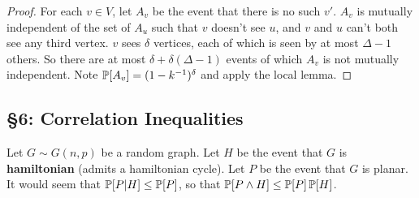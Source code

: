 \documentclass[11pt]{article}
\begin{document}
\begin{chapter5}
\begin{proof}
\INDENT For each $v\in V$, let $A_v$ be the event that there is no such $v'$. $A_v$ is mutually independent of the set of $A_u$ such that $v$ doesn't see $u$, and $v$ and $u$ can't both see any third vertex. $v$ sees $\delta$ vertices, each of which is seen by at most $\Delta-1$ others. So there are at most $\delta+\delta(\Delta-1)$ events of which $A_v$ is not mutually independent. Note $\operatorname{\mathbb{P}}[A_v]=(1-k^{-1})^\delta$ and apply the local lemma.
\end{proof}
\end{chapter5}
\begin{chapter6}
\section*{\S6: Correlation Inequalities}
\begin{itemise}
\item Let $G\sim G(n,p)$ be a random graph. Let $H$ be the event that $G$ is \textbf{hamiltonian} (admits a hamiltonian cycle). Let $P$ be the event that $G$ is planar. It would seem that $\operatorname{\mathbb{P}}[P|H]\leq\operatorname{\mathbb{P}}[P]$, so that $\operatorname{\mathbb{P}}[P\wedge H]\leq\operatorname{\mathbb{P}}[P]\operatorname{\mathbb{P}}[H]$.


\end{itemise}
\end{chapter6}
\end{document}
